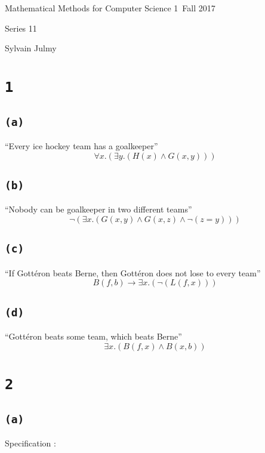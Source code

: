 \documentclass[a4paper,11pt]{report}
\author{Sylvain Julmy}
\date{\today}
\begin{document}
\begin{center}
  \Large{
    Mathematical Methods for Computer Science 1\
    Fall 2017
  }
  \noindent\makebox[\linewidth]{\rule{\linewidth}{0.4pt}}

  Series 11
  \vspace*{1.4cm}

  Sylvain Julmy
  
  \noindent\makebox[\linewidth]{\rule{\linewidth}{0.4pt}}
\end{center}

\section*{\texttt{1}}

\subsection*{\texttt{(a)}}
``Every ice hockey team has a goalkeeper''
\[
  \forall x.(\exists y. ( H(x) \wedge G(x,y) ))
\]

\subsection*{\texttt{(b)}}
``Nobody can be goalkeeper in two different teams''
\[
  \neg(\exists x.( G(x,y) \wedge G(x,z) \wedge \neg(z = y)))
\]

\subsection*{\texttt{(c)}}
``If Gottéron beats Berne, then Gottéron does not lose to every team''
\[
  B(f,b) \to \exists x.(\neg(L(f,x)))
\]

\subsection*{\texttt{(d)}}
``Gottéron beats some team, which beats Berne''
\[
  \exists x.(B(f,x) \wedge B(x,b))
\]

\section*{\texttt{2}}

\subsection*{\texttt{(a)}}

Specification :
\end{document}
